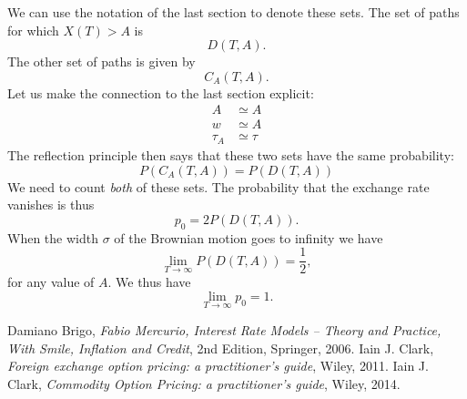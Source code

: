 \documentclass[12pt, oneside]{article}
\begin{document}
We can use the notation of the last section to denote these sets. The set of paths for which $X(T)>A$ is
\begin{equation}
	D(T,A).
\end{equation} 
The other set of paths is given by
\begin{equation}
	C_{A}(T,A).
\end{equation}
Let us make the connection to the last section explicit:
\begin{align}
	A &\simeq A \\
	w &\simeq A \\
	\tau_A &\simeq \tau
\end{align}
The reflection principle then says that these two sets have the same probability:
\begin{equation}
	P(C_{A}(T,A)) = P( D(T,A) )
\end{equation}
We need to count \emph{both} of these sets. The probability that the exchange rate vanishes is thus
\begin{equation}
	p_0 = 2 P( D(T,A) ).
\end{equation}
When the width $\sigma$ of the Brownian motion goes to infinity we have
\begin{equation}
	\lim_{T\rightarrow\infty} P( D(T,A) ) = \frac{1}{2},
\end{equation}
for any value of $A$. We thus have
\begin{equation}
	\lim_{T\rightarrow\infty} p_0 = 1.
\end{equation}


\begin{thebibliography}{WW}
	 Damiano Brigo, \emph{Fabio Mercurio, Interest Rate Models -- Theory and Practice, With Smile, Inflation and Credit}, 2nd Edition, Springer, 2006.
	 Iain J. Clark, \emph{Foreign exchange option pricing: a practitioner's guide}, Wiley, 2011.  
	 Iain J. Clark, \emph{Commodity Option Pricing: a practitioner's guide}, Wiley, 2014.  
\end{thebibliography}
\end{document}
